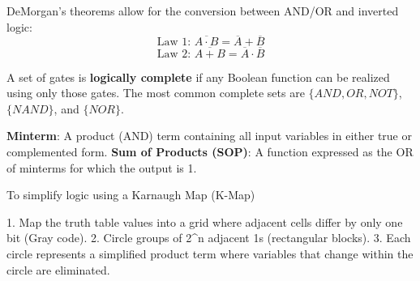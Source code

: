 \begin{theorem}
DeMorgan's theorems allow for the conversion between AND/OR and inverted logic:
$$\text{Law 1: } \overline{A \cdot B} = \overline{A} + \overline{B}$$
$$\text{Law 2: } \overline{A + B} = \overline{A} \cdot \overline{B}$$
\end{theorem}

\begin{important}
A set of gates is \textbf{logically complete} if any Boolean function can be realized using only those gates. The most common complete sets are $\{AND, OR, NOT\}$, $\{NAND\}$, and $\{NOR\}$.
\end{important}

\begin{definition}
\textbf{Minterm}: A product (AND) term containing all input variables in either true or complemented form.
\textbf{Sum of Products (SOP)}: A function expressed as the OR of minterms for which the output is 1.
\end{definition}

\begin{algorithm}
To simplify logic using a Karnaugh Map (K-Map)

1. Map the truth table values into a grid where adjacent cells differ by only one bit (Gray code).
2. Circle groups of 2^n adjacent 1s (rectangular blocks).
3. Each circle represents a simplified product term where variables that change within the circle are eliminated.
\end{algorithm}